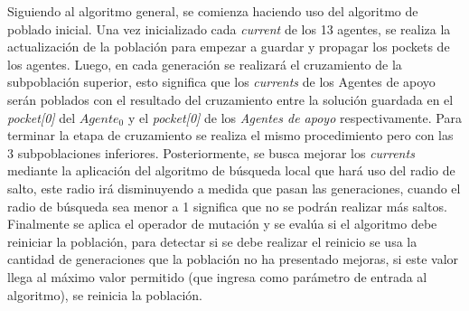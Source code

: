 Siguiendo al algoritmo general, se comienza haciendo uso del algoritmo de poblado inicial. Una vez inicializado cada \textit{current} de los 13 agentes, se realiza la actualización de la población para empezar a guardar y propagar los pockets de los agentes. Luego, en cada generación se realizará el cruzamiento de la subpoblación superior, esto significa que los \textit{currents} de los Agentes de apoyo serán poblados con el resultado del cruzamiento entre la solución guardada en el \textit{pocket[0]} del $Agente_0$ y el \textit{pocket[0]} de los \textit{Agentes de apoyo} respectivamente. Para terminar la etapa de cruzamiento se realiza el mismo procedimiento pero con las 3 subpoblaciones inferiores. Posteriormente, se busca mejorar los \textit{currents} mediante la aplicación del algoritmo de búsqueda local que hará uso del radio de salto, este radio irá disminuyendo a medida que pasan las generaciones, cuando el radio de búsqueda sea menor a 1 significa que no se podrán realizar más saltos. Finalmente se aplica el operador de mutación y se evalúa si el algoritmo debe reiniciar la población, para detectar si se debe realizar el reinicio se usa la cantidad de generaciones que la población no ha presentado mejoras, si este valor llega al máximo valor permitido (que ingresa como parámetro de entrada al algoritmo), se reinicia la población.
\\[25pt]
